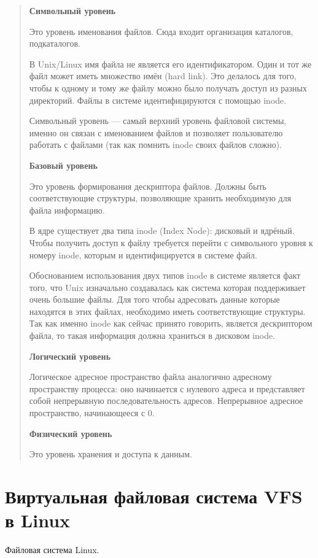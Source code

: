 \begin{quote}
\textbf{Символьный уровень}

Это уровень именования файлов. Сюда входит организация каталогов, подкаталогов.

В Unix/Linux имя файла не является его идентификатором. Один и тот же файл может иметь множество имён (hard link). Это делалось для того, чтобы к одному и тому же файлу можно было получать доступ из разных директорий. Файлы в системе идентифицируются с помощью inode.

Символьный уровень — самый верхний уровень файловой системы, именно он связан с именованием файлов и позволяет пользователю работать с файлами (так как помнить inode своих файлов сложно).

\textbf{Базовый уровень}

Это уровень формирования дескриптора файлов. Должны быть соответствующие структуры, позволяющие хранить необходимую для файла информацию.

В ядре существует два типа inode (Index Node): дисковый и ядрёный. Чтобы получить доступ к файлу требуется перейти с символьного уровня к номеру inode, которым и идентифицируется в системе файл.

Обоснованием использования двух типов inode в системе является факт того, что Unix изначально создавалась как система которая поддерживает очень большие файлы. Для того чтобы адресовать данные которые находятся в этих файлах, необходимо иметь соответствующие структуры. Так как именно inode как сейчас принято говорить, является дескриптором файла, то такая информация должна храниться в дисковом inode.

\textbf{Логический уровень}

Логическое адресное пространство файла аналогично адресному пространству процесса: оно начинается с нулевого адреса и представляет собой непрерывную последовательность адресов. Непрерывное адресное пространство, начинающееся с 0.

\textbf{Физический уровень}

Это уровень хранения и доступа к данным.

\end{quote}

\section{Виртуальная файловая система VFS в Linux}

Файловая система Linux.

